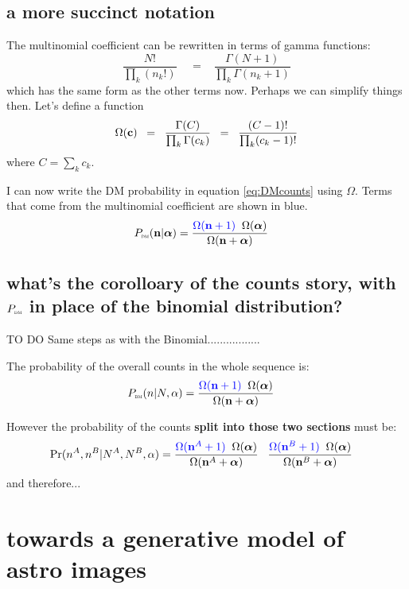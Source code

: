 \documentclass[12pt]{article}
\begin{document}
\subsection{a more succinct notation}

The multinomial coefficient can be rewritten in terms of gamma functions:
\[
\frac{N!}{\prod_k (n_k!)} \;
\;\;\; = \;\;\; 
\frac{\Gamma(N+1)}{\prod_k \Gamma(n_k+1)}
\]
which has the same form as the other terms now.
Perhaps we can simplify things then. Let's define a function
\begin{equation}
  \label{eq:omega}
 \Omega(\mathbf{c}) \;\;= \;\;\frac{\Gamma(C)}{\prod_k \Gamma(c_k)} \;\;=\;\; \frac{(C-1)!}{\prod_k (c_k-1)! }
\end{equation}
where $C=\sum_k c_k$.

I can now write the DM probability in equation \ref{eq:DMcounts} using $\Omega$. Terms that come from the multinomial coefficient are shown in {\color{blue}blue}.
\begin{align}
P_\text{\tiny\sc dm}(\mathbf{n} |\boldsymbol\alpha) &= 
\frac{{\color{blue}\Omega(\mathbf{n}+1)} \;\; \Omega(\boldsymbol\alpha)}{ \Omega(\mathbf{n} + \boldsymbol\alpha)}
\label{eq:DMcounts_inOmega}
\end{align}


\subsection{what's the corolloary of the counts story, with $P_\text{\tiny\sc dm}$ in place of the binomial distribution?}

TO DO Same steps as with the Binomial.................

The probability of the overall counts in the whole sequence is:
\begin{align*}
P_\text{\tiny\sc dm}(n | N,\alpha) &=  \frac{{\color{blue}\Omega(\mathbf{n}+1)} \;\; \Omega(\boldsymbol\alpha)}{ \Omega(\mathbf{n} + \boldsymbol\alpha)}
\end{align*}

However the probability of the counts {\bf split into those two sections} must be:
\begin{align*}
  \Pr(n^A, n^B| N^A,N^B,\alpha) &=  
\frac{{\color{blue}\Omega(\mathbf{n}^A+1)} \;\; \Omega(\boldsymbol\alpha)}{ \Omega(\mathbf{n}^A + \boldsymbol\alpha)}
\;\;\; \frac{{\color{blue}\Omega(\mathbf{n}^B+1)} \;\; \Omega(\boldsymbol\alpha)}{ \Omega(\mathbf{n}^B + \boldsymbol\alpha)}
\end{align*}
and therefore...


\section{towards a generative model of astro images}
\end{document}
